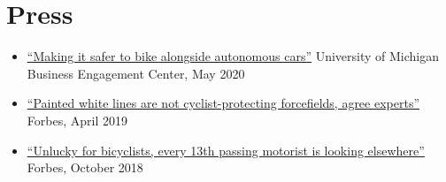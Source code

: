 \documentclass[11pt]{article}
\newenvironment{main}
{\begin{adjustwidth}{3em}{}}
{\end{adjustwidth}}
\begin{document}
\section*{Press}
\begin{main}

\begin{itemize}
    \item \href{https://bec.umich.edu/making-it-safer-to-bike-alongside-autonomous-cars/}{“Making it safer to bike alongside autonomous cars”} University of Michigan Business Engagement Center, May 2020
    \item \href{https://www.forbes.com/sites/carltonreid/2019/04/16/painted-white-lines-are-not-cyclist-protecting-forcefields-agree-experts/}{“Painted white lines are not cyclist-protecting forcefields, agree experts”} Forbes, April 2019
    \item \href{https://www.forbes.com/sites/carltonreid/2018/10/10/unlucky-for-bicyclists-every-13th-passing-motorist-is-looking-elsewhere/}{“Unlucky for bicyclists, every 13th passing motorist is looking elsewhere”} Forbes, October 2018
\end{itemize}


\end{main}
\end{document}

